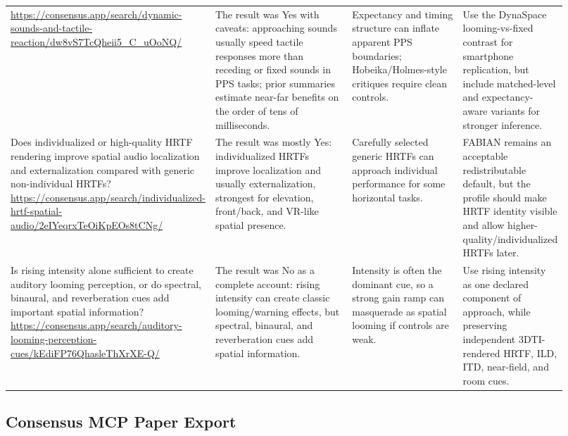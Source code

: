 \begin{longtable}{P{0.21\linewidth} P{0.31\linewidth} P{0.23\linewidth} P{0.17\linewidth}}
\newline\url{https://consensus.app/search/dynamic-sounds-and-tactile-reaction/dw8vS7TcQheii5_C_uOoNQ/}
& The result was Yes with caveats: approaching sounds usually speed tactile responses more than receding or fixed sounds in PPS tasks; prior summaries estimate near-far benefits on the order of tens of milliseconds.
& Expectancy and timing structure can inflate apparent PPS boundaries; Hobeika/Holmes-style critiques require clean controls.
& Use the DynaSpace looming-vs-fixed contrast for smartphone replication, but include matched-level and expectancy-aware variants for stronger inference.\\
\addlinespace
Does individualized or high-quality HRTF rendering improve spatial audio localization and externalization compared with generic non-individual HRTFs?
\newline\url{https://consensus.app/search/individualized-hrtf-spatial-audio/2eIYeqrxTeOiKpEOs8tCNg/}
& The result was mostly Yes: individualized HRTFs improve localization and usually externalization, strongest for elevation, front/back, and VR-like spatial presence.
& Carefully selected generic HRTFs can approach individual performance for some horizontal tasks.
& FABIAN remains an acceptable redistributable default, but the profile should make HRTF identity visible and allow higher-quality/individualized HRTFs later.\\
\addlinespace
Is rising intensity alone sufficient to create auditory looming perception, or do spectral, binaural, and reverberation cues add important spatial information?
\newline\url{https://consensus.app/search/auditory-looming-perception-cues/kEdiFP76QhasleThXrXE-Q/}
& The result was No as a complete account: rising intensity can create classic looming/warning effects, but spectral, binaural, and reverberation cues add spatial information.
& Intensity is often the dominant cue, so a strong gain ramp can masquerade as spatial looming if controls are weak.
& Use rising intensity as one declared component of approach, while preserving independent 3DTI-rendered HRTF, ILD, ITD, near-field, and room cues.\\
\bottomrule
\end{longtable}

\subsection*{Consensus MCP Paper Export}

